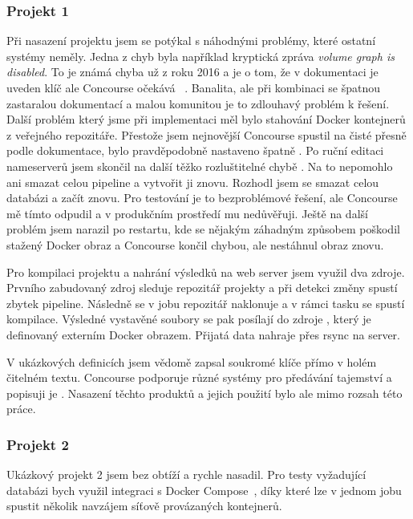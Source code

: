 
        \subsubsection{Projekt 1}
            Při nasazení projektu jsem se potýkal s náhodnými problémy, které ostatní \CI systémy neměly. Jedna z chyb byla například kryptická zpráva \textit{volume graph is disabled}. To je známá chyba už z roku 2016 a je o tom, že v dokumentaci je uveden klíč  ale Concourse očekává ~\cite{concourse-issue-402}. Banalita, ale při kombinaci se špatnou zastaralou dokumentací a malou komunitou je to zdlouhavý problém k řešení. Další problém který jsme při implementaci měl bylo stahování Docker kontejnerů z veřejného repozitáře. Přestože jsem nejnovější Concourse spustil na čisté  přesně podle dokumentace, bylo pravděpodobně nastaveno špatně . Po ruční editaci nameserverů jsem skončil na další těžko rozluštitelné chybě . Na to nepomohlo ani smazat celou pipeline a vytvořit ji znovu. Rozhodl jsem se smazat celou databázi a začít znovu. Pro testování je to bezproblémové řešení, ale Concourse mě tímto odpudil a v produkčním prostředí mu nedůvěřuji. Ještě na další problém jsem narazil po restartu, kde se nějakým záhadným způsobem poškodil stažený Docker obraz a Concourse končil chybou, ale nestáhnul obraz znovu.

            Pro kompilaci projektu a nahrání výsledků na web server jsem využil dva zdroje. Prvního zabudovaný zdroj  sleduje repozitář projekty a při detekci změny spustí zbytek pipeline. Následně se v jobu repozitář naklonuje a v rámci tasku se spustí kompilace. Výsledné vystavěné soubory se pak posílají do zdroje , který je definovaný externím Docker obrazem. Přijatá data nahraje přes rsync na server.

            V ukázkových definicích jsem vědomě zapsal soukromé klíče přímo v holém čitelném textu. Concourse podporuje různé systémy pro předávání tajemství a popisuji je . Nasazení těchto produktů a jejich použití bylo ale mimo rozsah této práce.

        \subsubsection{Projekt 2}
            Ukázkový projekt 2 jsem bez obtíží a rychle nasadil. Pro testy vyžadující databázi bych využil integraci s Docker Compose~\cite{concourse-compose}, díky které lze v jednom jobu spustit několik navzájem síťově provázaných kontejnerů.


